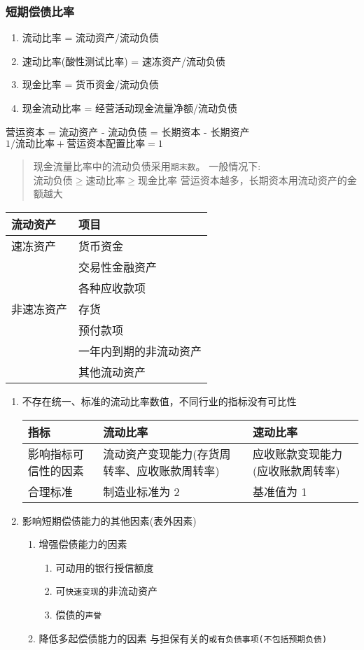 \documentclass[11pt]{article}
\begin{document}
\subsubsection{短期偿债比率}
\label{sec:org46d8ceb}
\begin{enumerate}
\item 流动比率 = 流动资产/流动负债
\item 速动比率(酸性测试比率) = 速冻资产/流动负债
\item 现金比率 = 货币资金/流动负债
\item 现金流动比率 = 经营活动现金流量净额/流动负债
\end{enumerate}
营运资本 = 流动资产 - 流动负债 = 长期资本 - 长期资产
\(1/流动比率 + 营运资本配置比率 = 1\)
\begin{quote}
现金流量比率中的流动负债采用\texttt{期末数}。
一般情况下:\(流动负债\geq 速动比率 \geq 现金比率\)
营运资本越多，长期资本用流动资产的金额越大
\end{quote}
\begin{center}
\begin{tabular}{ll}
流动资产 & 项目\\
\hline
速冻资产 & 货币资金\\
 & 交易性金融资产\\
 & 各种应收款项\\
非速冻资产 & 存货\\
 & 预付款项\\
 & 一年内到期的非流动资产\\
 & 其他流动资产\\
\end{tabular}
\end{center}
\begin{enumerate}
\item 不存在统一、标准的流动比率数值，不同行业的指标没有可比性
\label{sec:orgebee931}
\begin{center}
\begin{tabular}{lll}
指标 & 流动比率 & 速动比率\\
\hline
影响指标可信性的因素 & 流动资产变现能力(存货周转率、应收账款周转率) & 应收账款变现能力(应收账款周转率)\\
合理标准 & 制造业标准为 2 & 基准值为 1\\
\end{tabular}
\end{center}
\item 影响短期偿债能力的其他因素(表外因素)
\label{sec:org294a44d}
\begin{enumerate}
\item 增强偿债能力的因素
\label{sec:org6d37093}
\begin{enumerate}
\item 可动用的银行授信额度
\item 可\texttt{快速变现}的非流动资产
\item 偿债的\texttt{声誉}
\end{enumerate}
\item 降低多起偿债能力的因素
\label{sec:orgaa7b5a8}
与担保有关的\texttt{或有负债事项(不包括预期负债)}
\end{enumerate}
\end{enumerate}
\end{document}
